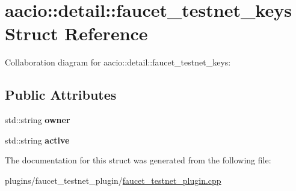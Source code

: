 \hypertarget{structaacio_1_1detail_1_1faucet__testnet__keys}{}\section{aacio\+:\+:detail\+:\+:faucet\+\_\+testnet\+\_\+keys Struct Reference}
\label{structaacio_1_1detail_1_1faucet__testnet__keys}


Collaboration diagram for aacio\+:\+:detail\+:\+:faucet\+\_\+testnet\+\_\+keys\+:
\subsection*{Public Attributes}
\begin{DoxyCompactItemize}
\item 
\mbox{\label{structaacio_1_1detail_1_1faucet__testnet__keys_a20b03bb19c57c64bc53510fb50953d7e}} 
std\+::string {\bfseries owner}
\item 
\mbox{\label{structaacio_1_1detail_1_1faucet__testnet__keys_ae65b568729632d35e6f46f3a58f4ecda}} 
std\+::string {\bfseries active}
\end{DoxyCompactItemize}


The documentation for this struct was generated from the following file\+:\begin{DoxyCompactItemize}
\item 
plugins/faucet\+\_\+testnet\+\_\+plugin/\mbox{\hyperlink{faucet__testnet__plugin_8cpp}{faucet\+\_\+testnet\+\_\+plugin.\+cpp}}\end{DoxyCompactItemize}
